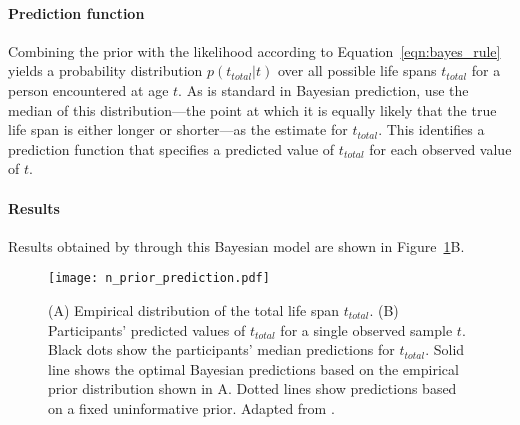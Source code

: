 \documentclass[10pt,letterpaper]{article}
\begin{document}
\paragraph{Prediction function}

Combining the prior with the likelihood according to Equation~\ref{eqn:bayes_rule} yields a probability distribution $p(t_{total} | t)$ over all possible life spans $t_{total}$ for a person encountered at age $t$. As is standard in Bayesian prediction,  use the median of this distribution---the point at which it is equally likely that the true life span is either longer or shorter---as the estimate for $t_{total}$.  This identifies a prediction function that specifies a predicted value of $t_{total}$ for each observed value of $t$. 


\paragraph{Results}

Results obtained by  through this Bayesian model are shown in Figure~\ref{fig:model_prior_prediction}B. 

\begin{figure}[h]
\begin{center}
\texttt{[image: n\_prior\_prediction.pdf]}
\end{center}
\caption{(A) Empirical distribution of the total life span $t_{total}$. (B) Participants' predicted values of $t_{total}$ for a single observed sample $t$. Black dots show the participants' median predictions for $t_{total}$. Solid line shows the optimal Bayesian predictions based on the empirical prior distribution shown in A. Dotted lines show predictions based on a fixed uninformative prior. Adapted from .} 
\label{fig:model_prior_prediction}
\end{figure}
\end{document}
